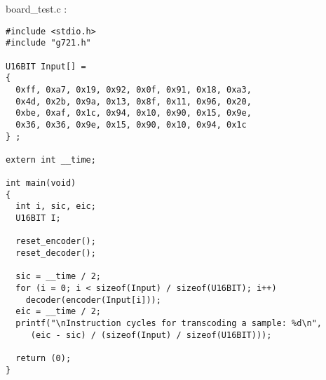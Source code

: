 board\_test.c :

\begin{verbatim}
#include <stdio.h>
#include "g721.h"

U16BIT Input[] = 
{
  0xff, 0xa7, 0x19, 0x92, 0x0f, 0x91, 0x18, 0xa3,
  0x4d, 0x2b, 0x9a, 0x13, 0x8f, 0x11, 0x96, 0x20,
  0xbe, 0xaf, 0x1c, 0x94, 0x10, 0x90, 0x15, 0x9e,
  0x36, 0x36, 0x9e, 0x15, 0x90, 0x10, 0x94, 0x1c
} ;

extern int __time;

int main(void)
{
  int i, sic, eic;
  U16BIT I;

  reset_encoder();
  reset_decoder();

  sic = __time / 2;
  for (i = 0; i < sizeof(Input) / sizeof(U16BIT); i++)
    decoder(encoder(Input[i]));
  eic = __time / 2;
  printf("\nInstruction cycles for transcoding a sample: %d\n",
	 (eic - sic) / (sizeof(Input) / sizeof(U16BIT)));

  return (0);
}
\end{verbatim}